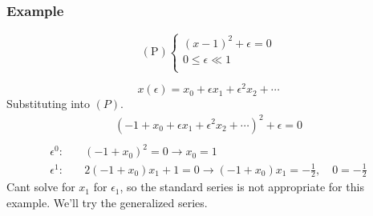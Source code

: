 \documentclass[12pt,twoside]{article}
\begin{document}
\subsubsection{Example}
\begin{equation*} (\text{P}) \left\{
  \begin{aligned}
    (x-1)^2+\epsilon=0 \\
    0\le\epsilon\ll1 \\
  \end{aligned} \right.
\end{equation*}

\begin{equation*}
  x(\epsilon) = x_0 + \epsilon x_1 + \epsilon^2 x_2 + \cdots
\end{equation*}
Substituting into $(P)$.
\begin{equation*}
  \begin{aligned}
    (-1+x_0+\epsilon x_1+\epsilon^2 x_2+\cdots)^2 + \epsilon = 0 \\
  \end{aligned}
\end{equation*}
\begin{equation*}
  \begin{aligned}
    \epsilon^0:&\quad (-1+x_0)^2=0\longrightarrow x_0=1 \\
    \epsilon^1:&\quad 2(-1+x_0)x_1+1=0\longrightarrow (-1+x_0)x_1=-\frac{1}{2},\quad 0=-\frac{1}{2}
  \end{aligned}
\end{equation*}
Cant solve for $x_1$ for $\epsilon_1$, so the standard series is not appropriate
for this example. We'll try the generalized series.
\end{document}
